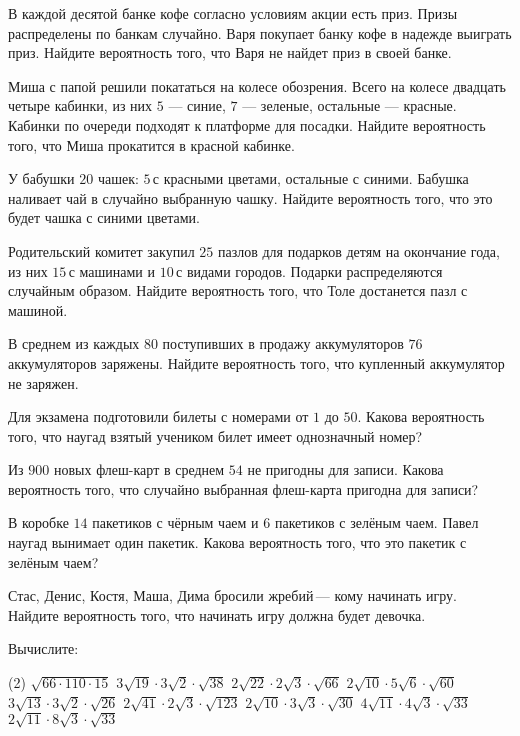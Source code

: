 \begin{class}[number=3]
\begin{listofex}
		\item В каждой десятой банке кофе согласно условиям акции есть приз. Призы распределены по банкам случайно. Варя покупает банку кофе в надежде выиграть приз. Найдите вероятность того, что Варя не найдет приз в своей банке.
		\item Миша с папой решили покататься на колесе обозрения. Всего на колесе двадцать четыре кабинки, из них \( 5 \) --- синие, \( 7 \) --- зеленые, остальные  — красные. Кабинки по очереди подходят к платформе для посадки. Найдите вероятность того, что Миша прокатится в красной кабинке.
		\item У бабушки \( 20 \) чашек: \( 5 \) с красными цветами, остальные с синими. Бабушка наливает чай в случайно выбранную чашку. Найдите вероятность того, что это будет чашка с синими цветами.
		\item Родительский комитет закупил \( 25 \) пазлов для подарков детям на окончание года, из них \( 15 \) с машинами и \( 10 \) с видами городов. Подарки распределяются случайным образом. Найдите вероятность того, что Толе достанется пазл с машиной.
		\item В среднем из каждых \( 80 \) поступивших в продажу аккумуляторов \( 76 \) аккумуляторов заряжены. Найдите вероятность того, что купленный аккумулятор не заряжен.
		\item Для экзамена подготовили билеты с номерами от \( 1 \) до \( 50 \). Какова вероятность того, что наугад взятый учеником билет имеет однозначный номер?
		\item Из \( 900 \) новых флеш-карт в среднем \( 54 \) не пригодны для записи. Какова вероятность того, что случайно выбранная флеш-карта пригодна для записи?
		\item В коробке \( 14 \) пакетиков с чёрным чаем и \( 6 \) пакетиков с зелёным чаем. Павел наугад вынимает один пакетик. Какова вероятность того, что это пакетик с зелёным чаем?
		\item Стас, Денис, Костя, Маша, Дима бросили жребий --- кому начинать игру. Найдите вероятность того, что начинать игру должна будет девочка.
		\item Вычислите:
		\begin{tasks}(2)
			\task \( \sqrt{66\cdot110\cdot15} \)
			\task \( 3\sqrt{19}\cdot3\sqrt{2}\cdot\sqrt{38} \)
			\task \( 2\sqrt{22}\cdot2\sqrt{3}\cdot\sqrt{66} \)
			\task \( 2\sqrt{10}\cdot5\sqrt{6}\cdot\sqrt{60} \)
			\task \( 3\sqrt{13}\cdot3\sqrt{2}\cdot\sqrt{26} \)
			\task \( 2\sqrt{41}\cdot2\sqrt{3}\cdot\sqrt{123} \)
			\task \( 2\sqrt{10}\cdot3\sqrt{3}\cdot\sqrt{30} \)
			\task \( 4\sqrt{11}\cdot4\sqrt{3}\cdot\sqrt{33} \)
			\task \( 2\sqrt{11}\cdot8\sqrt{3}\cdot\sqrt{33} \)
		\end{tasks}
	\end{listofex}
\end{class}

